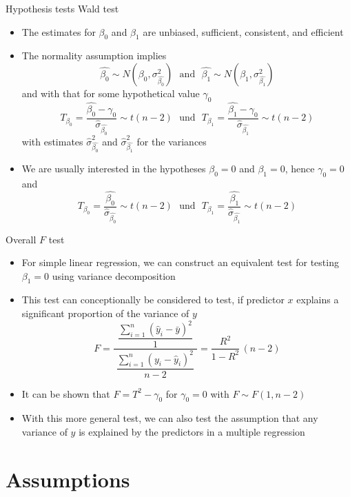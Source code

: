 \documentclass[aspectratio=169]{beamer}
\begin{document}
\begin{frame}[fragile]{Hypothesis tests}
  {Wald test}
  \begin{itemize}
    \item The estimates for $\beta_0$ and $\beta_1$ are unbiased, sufficient,
      consistent, and efficient
    \item The normality assumption implies
\[
  \hat{\beta_0} \sim N (\beta_0, \sigma^2_{\hat{\beta_0}})
  ~~~\text{and}~~~
  \hat{\beta_1} \sim N (\beta_1, \sigma^2_{\hat{\beta_1}})
\]
      and with that for some hypothetical value $\gamma_0$
\[
  T_{\beta_0} = \frac{\hat{\beta_0} - \gamma_0}{\hat{\sigma}_{\hat{\beta_0}}} \sim t (n-2)
  ~~~\text{und}~~~
  T_{\beta_1} = \frac{\hat{\beta_1} - \gamma_0}{\hat{\sigma}_{\hat{\beta_1}}} \sim t (n-2)
\]
with estimates $\hat{\sigma}^2_{\hat{\beta_0}}$ and
$\hat{\sigma}^2_{\hat{\beta_1}}$ for the variances
    \item We are usually interested in the hypotheses $\beta_0 = 0$ and $\beta_1
      = 0$, hence $\gamma_0 = 0$ and
\[
  T_{\beta_0} = \frac{\hat{\beta_0}}{\hat{\sigma}_{\hat{\beta_0}}} \sim t (n-2)
  ~~~\text{und}~~~
  T_{\beta_1} = \frac{\hat{\beta_1}}{\hat{\sigma}_{\hat{\beta_1}}} \sim t (n-2)
\]
  \end{itemize}
\end{frame}

\begin{frame}{Overall $F$ test}
  \begin{itemize}
    \item For simple linear regression, we can construct an equivalent test
      for testing $\beta_1 = 0$ using variance decomposition
    \item This test can conceptionally be considered to test, if predictor $x$
      explains a significant proportion of the variance of $y$
\[
  F = \dfrac{~~\dfrac{\sum_{i=1}^n (\hat{y}_i - \bar{y})^2}{1}~~}
      {\dfrac{\sum_{i=1}^n (y_i - \hat{y}_i)^2}{n-2}} = 
      \dfrac{R^2}{1 - R^2} \, (n - 2)
\]
\item It can be shown that $F = T^2-{\gamma_0}$ for $\gamma_0 = 0$
 with $F \sim F(1,n-2)$
 \item With this more general test, we can also test the assumption that any
   variance of $y$ is explained by the predictors in a multiple regression 
  \end{itemize}
\end{frame}

\section{Assumptions}
\end{document}
